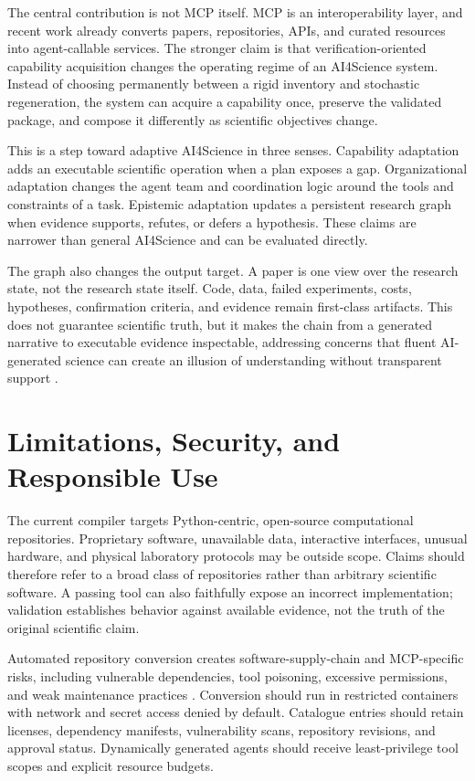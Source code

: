\documentclass[letterpaper]{article} %
\begin{document}
The central contribution is not MCP itself. MCP is an interoperability layer, and recent work already converts papers, repositories, APIs, and curated resources into agent-callable services. The stronger claim is that verification-oriented capability acquisition changes the operating regime of an AI4Science system. Instead of choosing permanently between a rigid inventory and stochastic regeneration, the system can acquire a capability once, preserve the validated package, and compose it differently as scientific objectives change.

This is a step toward adaptive AI4Science in three senses. Capability adaptation adds an executable scientific operation when a plan exposes a gap. Organizational adaptation changes the agent team and coordination logic around the tools and constraints of a task. Epistemic adaptation updates a persistent research graph when evidence supports, refutes, or defers a hypothesis. These claims are narrower than general AI4Science and can be evaluated directly.

The graph also changes the output target. A paper is one view over the research state, not the research state itself. Code, data, failed experiments, costs, hypotheses, confirmation criteria, and evidence remain first-class artifacts. This does not guarantee scientific truth, but it makes the chain from a generated narrative to executable evidence inspectable, addressing concerns that fluent AI-generated science can create an illusion of understanding without transparent support \citep{messeri2024illusions}.

\section{Limitations, Security, and Responsible Use}

The current compiler targets Python-centric, open-source computational repositories. Proprietary software, unavailable data, interactive interfaces, unusual hardware, and physical laboratory protocols may be outside scope. Claims should therefore refer to a broad class of repositories rather than arbitrary scientific software. A passing tool can also faithfully expose an incorrect implementation; validation establishes behavior against available evidence, not the truth of the original scientific claim.

Automated repository conversion creates software-supply-chain and MCP-specific risks, including vulnerable dependencies, tool poisoning, excessive permissions, and weak maintenance practices \citep{hasan2025mcpfirst,hou2026mcp}. Conversion should run in restricted containers with network and secret access denied by default. Catalogue entries should retain licenses, dependency manifests, vulnerability scans, repository revisions, and approval status. Dynamically generated agents should receive least-privilege tool scopes and explicit resource budgets.
\end{document}

